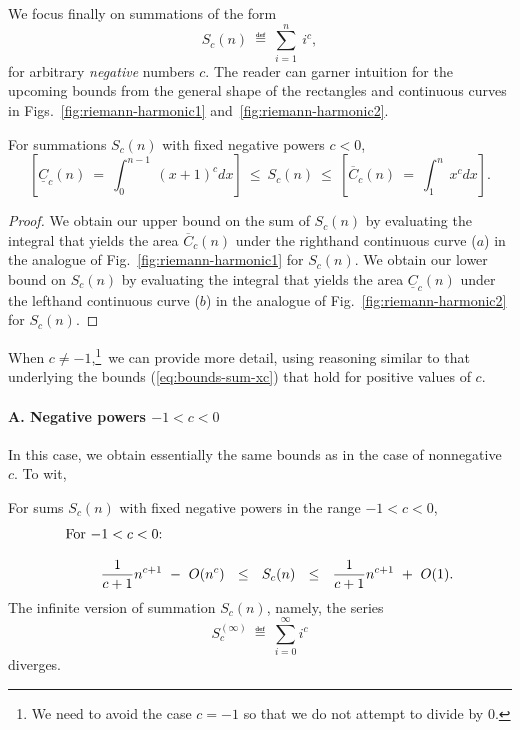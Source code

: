 We focus finally on summations of the form
\[ S_c(n) \ \eqdef \ \sum_{i=1}^n \ i^c, \]
for arbitrary {\em negative} numbers $c$.  The reader can garner
intuition for the upcoming bounds from the general shape of the
rectangles and continuous curves in Figs.~\ref{fig:riemann-harmonic1}
and~\ref{fig:riemann-harmonic2}.

\begin{prop}
\label{thm:general-bounds-negative-xc}
For summations $S_c(n)$ with fixed negative powers $c<0$,
\begin{equation} 
\label{eq:general-bounds-negative-xc}
\left[
\underline{C}_c(n) \ = \
\int_0^{n-1} \ (x+1)^c dx
\right]
\ \leq \ S_c(n) \ \leq \
\left[
\overline{C}_c(n) \ = \
\int_1^n \ x^c dx
\right].
\end{equation}
\end{prop}

\begin{proof}
We obtain our upper bound on the sum of $S_c(n)$ by evaluating the
integral that yields the area $\overline{C}_c(n)$ under the righthand
continuous curve ($a$) in the analogue of
Fig.~\ref{fig:riemann-harmonic1} for $S_c(n)$.  We obtain our lower
bound on $S_c(n)$ by evaluating the integral that yields the area
$\underline{C}_c(n)$ under the lefthand continuous curve ($b$) in the
analogue of Fig.~\ref{fig:riemann-harmonic2} for $S_c(n)$.
\end{proof}

When $c \neq -1$,\footnote{We need to avoid the case $c = -1$ so that
  we do not attempt to divide by $0$.}~we can provide more detail,
using reasoning similar to that underlying the bounds
(\ref{eq:bounds-sum-xc}) that hold for positive values of $c$.

\paragraph{A. Negative powers $-1 < c < 0$}

In this case, we obtain essentially the same bounds as in the case of
nonnegative $c$.  To wit,

\begin{prop}
\label{thm:bounds-(-1)<c<0}
For sums $S_c(n)$ with fixed negative powers in the range $-1 < c<0$,
\begin{equation}
\label{eq:bounds-(-1)<c<0}
\begin{array}{l}
\mbox{For $-1 < c< 0$:} \\
 \\
\hspace*{.35in}
{\displaystyle \frac{1}{c+1} n^{c+1} \ - \ O(n^c)}
  \ \ \leq \ \ S_c(n)
  \ \ \leq \ \
{\displaystyle \frac{1}{c+1} n^{c+1} \ + \ O(1)}.
\end{array}
\end{equation}
The infinite version of summation $S_c(n)$, namely, the series
\[ S_c^{(\infty)} \ \eqdef \ \sum_{i=0}^\infty i^c \]
diverges.
\end{prop}


